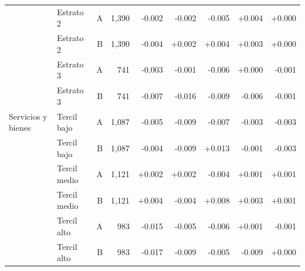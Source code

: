 \begin{table}[H]
{\begin{tabular}{llrrrrrrr}
    \addlinespace
     & Estrato 2 & A & 1,390 & -0.002 & -0.002 & -0.005 & +0.004 & +0.000 \\
     & Estrato 2 & B & 1,390 & -0.004 & +0.002 & +0.004 & +0.003 & +0.000 \\
    \addlinespace
     & Estrato 3 & A & 741 & -0.003 & -0.001 & -0.006 & +0.000 & -0.001 \\
     & Estrato 3 & B & 741 & -0.007 & -0.016 & -0.009 & -0.006 & -0.001 \\
    \midrule
    Servicios y bienes & Tercil bajo & A & 1,087 & -0.005 & -0.009 & -0.007 & -0.003 & -0.003 \\
     & Tercil bajo & B & 1,087 & -0.004 & -0.009 & +0.013 & -0.001 & -0.003 \\
    \addlinespace
     & Tercil medio & A & 1,121 & +0.002 & +0.002 & -0.004 & +0.001 & +0.001 \\
     & Tercil medio & B & 1,121 & +0.004 & -0.004 & +0.008 & +0.003 & +0.001 \\
    \addlinespace
     & Tercil alto & A & 983 & -0.015 & -0.005 & -0.006 & +0.001 & -0.001 \\
     & Tercil alto & B & 983 & -0.017 & -0.009 & -0.005 & -0.009 & +0.000 \\
    \bottomrule
  \end{tabular}%
  }
\end{table}